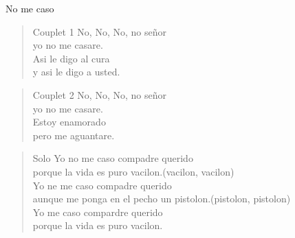 \begin{song}{No me caso}
\begin{verse}{Couplet 1}
No, No, No, no se\~nor\\
yo no me casare.\\
Asi le digo al cura\\
y asi le digo a usted.\\
\end{verse}
\begin{verse}{Couplet 2}
No, No, No, no se\~nor\\
yo no me casare.\\
Estoy enamorado\\
pero me aguantare.\\
\end{verse}

\begin{verse}{Solo}
 Yo no me caso compadre querido\\
porque la vida es puro vacilon.\hspace{8em}(vacilon, vacilon)\\
\chord{\hspace{1pt}}Yo ne me caso compadre querido\\
aunque me ponga en el pecho un pistolon.\hspace{3em}(pistolon, pistolon)\\
\chord{\hspace{1pt}}Yo me caso compardre querido\\
porque la vida es puro vacilon.\\
\end{verse}

\end{song}
